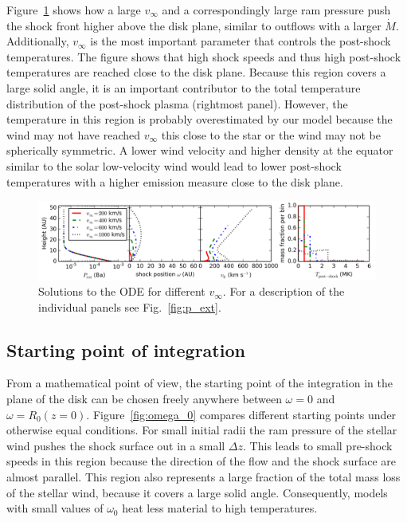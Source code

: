 \documentclass[manuscript]{aastex}
\begin{document}
Figure~\ref{fig:v_infty} shows how a large $v_\infty$ and a correspondingly large ram pressure push the shock front higher above the disk plane, similar to outflows with a larger $\dot M$. Additionally, $v_\infty$ is the most important parameter that controls the post-shock temperatures.
The figure shows that high shock speeds and thus high post-shock temperatures are reached close to the disk plane. Because this region covers a large solid angle, it is an important contributor to the total temperature distribution of the post-shock plasma (rightmost panel). However, the temperature in this region is probably overestimated by our model because the wind may not have reached $v_\infty$ this close to the star or the wind may not be spherically symmetric. A lower wind velocity and higher density at the equator similar to the solar low-velocity wind would lead to lower post-shock temperatures with a higher emission measure close to the disk plane.


\begin{figure}[h!]
\begin{center}
\includegraphics[width=1\columnwidth]{figures/v_infty/v_infty.png}
\caption{\label{fig:v_infty}
Solutions to the ODE for different $v_\infty$. For a description of the individual panels see Fig.~\ref{fig:p_ext}.}
\end{center}
\end{figure}

\subsection{Starting point of integration}
\label{sect:omega0}
From a mathematical point of view, the starting point of the integration in the plane of the disk can be chosen freely anywhere between $\omega=0$ and $\omega=R_0(z=0)$. Figure~\ref{fig:omega_0} compares different starting points under otherwise equal conditions. For small initial radii the ram pressure of the stellar wind pushes the shock surface out in a small $\Delta z$. This leads to small pre-shock speeds in this region because the direction of the flow and the shock surface are almost parallel. This region also represents a large fraction of the total mass loss of the stellar wind, because it covers a large solid angle. Consequently, models with small values of $\omega_0$ heat less material to high temperatures. 
\end{document}
